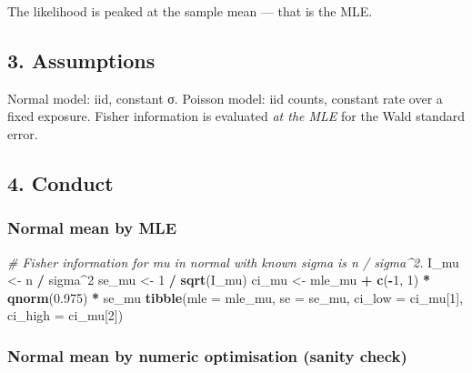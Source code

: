 \documentclass[
]{article}
\newenvironment{Shaded}{\begin{snugshade}}{\end{snugshade}}
\newcommand{\AttributeTok}[1]{\textcolor[rgb]{0.13,0.29,0.53}{#1}}
\newcommand{\CommentTok}[1]{\textcolor[rgb]{0.56,0.35,0.01}{\textit{#1}}}
\newcommand{\DecValTok}[1]{\textcolor[rgb]{0.00,0.00,0.81}{#1}}
\newcommand{\FloatTok}[1]{\textcolor[rgb]{0.00,0.00,0.81}{#1}}
\newcommand{\FunctionTok}[1]{\textcolor[rgb]{0.13,0.29,0.53}{\textbf{#1}}}
\newcommand{\NormalTok}[1]{#1}
\newcommand{\OtherTok}[1]{\textcolor[rgb]{0.56,0.35,0.01}{#1}}
\newcommand{\SpecialCharTok}[1]{\textcolor[rgb]{0.81,0.36,0.00}{\textbf{#1}}}
\begin{document}
The likelihood is peaked at the sample mean --- that is the MLE.

\subsection{3. Assumptions}\label{assumptions}

Normal model: iid, constant σ. Poisson model: iid counts, constant rate
over a fixed exposure. Fisher information is evaluated \emph{at the MLE}
for the Wald standard error.

\subsection{4. Conduct}\label{conduct}

\subsubsection{Normal mean by MLE}\label{normal-mean-by-mle}

\begin{Shaded}
\begin{Highlighting}[]
\CommentTok{\# Fisher information for mu in normal with known sigma is n / sigma\^{}2.}
\NormalTok{I\_mu }\OtherTok{\textless{}{-}}\NormalTok{ n }\SpecialCharTok{/}\NormalTok{ sigma}\SpecialCharTok{\^{}}\DecValTok{2}
\NormalTok{se\_mu }\OtherTok{\textless{}{-}} \DecValTok{1} \SpecialCharTok{/} \FunctionTok{sqrt}\NormalTok{(I\_mu)}
\NormalTok{ci\_mu }\OtherTok{\textless{}{-}}\NormalTok{ mle\_mu }\SpecialCharTok{+} \FunctionTok{c}\NormalTok{(}\SpecialCharTok{{-}}\DecValTok{1}\NormalTok{, }\DecValTok{1}\NormalTok{) }\SpecialCharTok{*} \FunctionTok{qnorm}\NormalTok{(}\FloatTok{0.975}\NormalTok{) }\SpecialCharTok{*}\NormalTok{ se\_mu}
\FunctionTok{tibble}\NormalTok{(}\AttributeTok{mle =}\NormalTok{ mle\_mu, }\AttributeTok{se =}\NormalTok{ se\_mu,}
       \AttributeTok{ci\_low =}\NormalTok{ ci\_mu[}\DecValTok{1}\NormalTok{], }\AttributeTok{ci\_high =}\NormalTok{ ci\_mu[}\DecValTok{2}\NormalTok{])}
\end{Highlighting}
\end{Shaded}

\subsubsection{Normal mean by numeric optimisation (sanity
check)}\label{normal-mean-by-numeric-optimisation-sanity-check}
\end{document}

